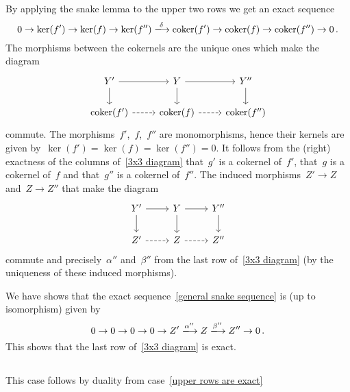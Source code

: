By applying the snake lemma to the upper two rows we get an exact sequence
\begin{equation}
  \label{general snake sequence}
  0
  \to
  \ker(f')
  \to
  \ker(f)
  \to
  \ker(f'')
  \xlongto{\delta}
  \coker(f')
  \to
  \coker(f)
  \to
  \coker(f'')
  \to
  0 \,.
\end{equation}
The morphisms between the cokernels are the unique ones which make the diagram
\[
  \begin{tikzcd}
      Y'
      \arrow{r}
      \arrow{d}
    & Y
      \arrow{r}
      \arrow{d}
    & Y''
      \arrow{d}
    \\
      \coker(f')
      \arrow[dashed]{r}
    & \coker(f)
      \arrow[dashed]{r}
    & \coker(f'')
  \end{tikzcd}
\]
commute.
The morphisms~$f'$,~$f$,~$f''$ are monomorphisms, hence their kernels are given by~$\ker(f') = \ker(f) = \ker(f'') = 0$.
It follows from the (right) exactness of the columns of~\eqref{3x3 diagram} that~$g'$ is a cokernel of~$f'$, that~$g$ is a cokernel of~$f$ and that~$g''$ is a cokernel of~$f''$.
The induced morphisms~$Z' \to Z$ and~$Z \to Z''$ that make the diagram
\[
  \begin{tikzcd}
      Y'
      \arrow{r}
      \arrow{d}
    & Y
      \arrow{r}
      \arrow{d}
    & Y''
      \arrow{d}
    \\
      Z'
      \arrow[dashed]{r}
    & Z
      \arrow[dashed]{r}
    & Z''
  \end{tikzcd}
\]
commute and precisely~$\alpha''$ and~$\beta''$ from the last row of~\eqref{3x3 diagram} (by the uniqueness of these induced morphisms).

We have shows that the exact sequence~\eqref{general snake sequence} is (up to isomorphism) given by
\[
  0
  \to
  0
  \to
  0
  \to
  0
  \to
  Z'
  \xlongto{\alpha''}
  Z
  \xlongto{\beta''}
  Z''
  \to
  0 \,.
\]
This shows that the last row of~\eqref{3x3 diagram} is exact.





\subsection{}

This case follows by duality from case~\ref{upper rows are exact}





\subsection{}

